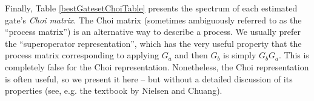 \documentclass{article}[11pt]
\begin{document}




Finally, Table \ref{bestGatesetChoiTable} presents the spectrum of each estimated gate's \emph{Choi matrix}.  The Choi matrix (sometimes ambiguously referred to as the ``process matrix'') is an alternative way to describe a process.  We usually prefer the ``superoperator representation'', which has the very useful property that the process matrix corresponding to applying $G_a$ and then $G_b$ is simply $G_bG_a$.  This is completely false for the Choi representation.  Nonetheless, the Choi representation is often useful, so we present it here -- but without a detailed discussion of its properties (see, e.g. the textbook by Nielsen and Chuang).
\end{document}
